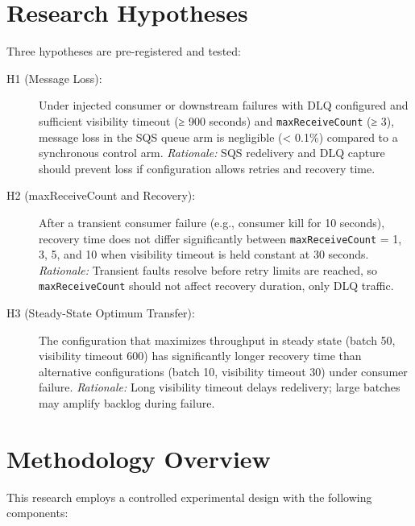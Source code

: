 \section{Research Hypotheses}

Three hypotheses are pre-registered and tested:

\begin{description}
    \item[H1 (Message Loss):] Under injected consumer or downstream failures with DLQ configured and sufficient visibility timeout (≥ 900 seconds) and \texttt{maxReceiveCount} (≥ 3), message loss in the SQS queue arm is negligible (< 0.1\%) compared to a synchronous control arm. \emph{Rationale:} SQS redelivery and DLQ capture should prevent loss if configuration allows retries and recovery time.
    
    \item[H2 (maxReceiveCount and Recovery):] After a transient consumer failure (e.g., consumer kill for 10 seconds), recovery time does not differ significantly between \texttt{maxReceiveCount} = 1, 3, 5, and 10 when visibility timeout is held constant at 30 seconds. \emph{Rationale:} Transient faults resolve before retry limits are reached, so \texttt{maxReceiveCount} should not affect recovery duration, only DLQ traffic.
    
    \item[H3 (Steady-State Optimum Transfer):] The configuration that maximizes throughput in steady state (batch 50, visibility timeout 600) has significantly longer recovery time than alternative configurations (batch 10, visibility timeout 30) under consumer failure. \emph{Rationale:} Long visibility timeout delays redelivery; large batches may amplify backlog during failure.
\end{description}

\section{Methodology Overview}

This research employs a controlled experimental design with the following components:

